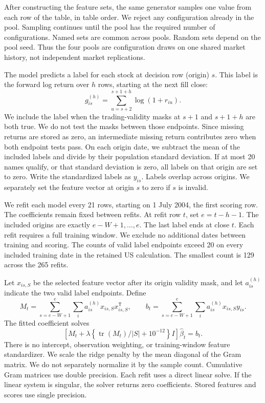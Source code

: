 \documentclass[10pt,letterpaper]{article}
\begin{document}
After constructing the feature sets, the same generator samples one value from each row of the table, in table order. We reject any configuration already in the pool. Sampling continues until the pool has the required number of configurations. Named sets are common across pools. Random sets depend on the pool seed. Thus the four pools are configuration draws on one shared market history, not independent market replications.

The model predicts a label for each stock at decision row (origin) $s$. This label is the forward log return over $h$ rows, starting at the next fill close:
\[
 g_{is}^{(h)}=\sum_{u=s+2}^{s+1+h}\log(1+r_{iu}).
\]
We include the label when the trading-validity masks at $s+1$ and $s+1+h$ are both true. We do not test the masks between those endpoints. Since missing returns are stored as zero, an intermediate missing return contributes zero when both endpoint tests pass. On each origin date, we subtract the mean of the included labels and divide by their population standard deviation. If at most 20 names qualify, or that standard deviation is zero, all labels on that origin are set to zero. Write the standardized labels as $y_{is}$. Labels overlap across origins. We separately set the feature vector at origin $s$ to zero if $s$ is invalid.

We refit each model every 21 rows, starting on 1 July 2004, the first scoring row. The coefficients remain fixed between refits. At refit row $t$, set $e=t-h-1$. The included origins are exactly $e-W+1,\ldots,e$. The last label ends at close $t$. Each refit requires a full training window. We exclude no additional dates between training and scoring. The counts of valid label endpoints exceed 20 on every included training date in the retained US calculation. The smallest count is 129 across the 265 refits.

Let $x_{is,S}$ be the selected feature vector after its origin validity mask, and let $a_{is}^{(h)}$ indicate the two valid label endpoints. Define
\[
 M_t=\sum_{s=e-W+1}^{e}\sum_i a_{is}^{(h)}x_{is,S}x_{is,S}^{\mathsf T},\qquad
 b_t=\sum_{s=e-W+1}^{e}\sum_i a_{is}^{(h)}x_{is,S}y_{is}.
\]
The fitted coefficient solves
\[
 \left[M_t+\lambda\left\{\operatorname{tr}(M_t)/|S|+10^{-12}\right\}I\right]
 \widehat\beta_t=b_t.
\]
There is no intercept, observation weighting, or training-window feature standardizer. We scale the ridge penalty by the mean diagonal of the Gram matrix. We do not separately normalize it by the sample count. Cumulative Gram matrices use double precision. Each refit uses a direct linear solve. If the linear system is singular, the solver returns zero coefficients. Stored features and scores use single precision.
\end{document}
